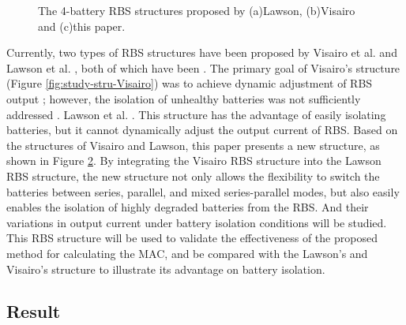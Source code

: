 \documentclass{article}
\begin{document}
\begin{figure}[htbp]
\begin{subfigure}[b]{0.31\textwidth}
        \caption{}
        \label{fig:study-stru-my}
    \end{subfigure}
    \caption{The 4-battery RBS structures proposed by (a)Lawson\cite{lawsonSoftwareConfigurableBattery2012}, (b)Visairo\cite{visairoReconfigurableBatteryPack2008} and (c)this paper.}
\end{figure}

Currently, two types of RBS structures have been proposed by Visairo et al. \cite{visairoReconfigurableBatteryPack2008} and Lawson et al. \cite{lawsonSoftwareConfigurableBattery2012}, both of which have been . 
The primary goal of Visairo's structure (Figure \ref{fig:study-stru-Visairo}) was to achieve dynamic adjustment of RBS output ; however, the isolation of unhealthy batteries was not sufficiently addressed . 
Lawson et al. . 
This structure has the advantage of easily isolating batteries, but it cannot dynamically adjust the output current of RBS. 
Based on the structures of Visairo and Lawson, this paper presents a new structure, as shown in Figure \ref{fig:study-stru-my}.
By integrating the Visairo RBS structure into the Lawson RBS structure, the new structure not only allows the flexibility to switch the batteries between series, parallel, and mixed series-parallel modes, but also easily enables the isolation of highly degraded batteries from the RBS.
And their variations in output current under battery isolation conditions will be studied.
This RBS structure will be used to validate the effectiveness of the proposed method for calculating the MAC, and be compared with the Lawson's and Visairo's structure to illustrate its advantage on battery isolation.

\subsection{Result}
\end{document}
